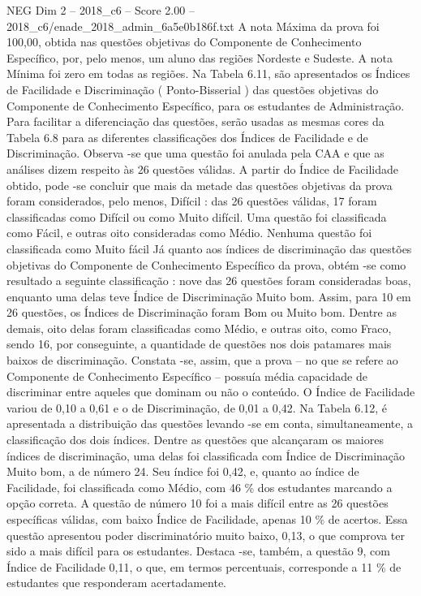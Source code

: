 \begin{textsample}{NEG Dim 2 – 2018\_c6 – Score 2.00 – 2018\_c6/enade\_2018\_admin\_6a5e0b186f.txt}
A nota Máxima da prova foi 100,00, obtida nas questões objetivas do Componente de Conhecimento Específico, por, pelo menos, um aluno das regiões Nordeste e Sudeste.
A nota Mínima foi zero em todas as regiões.
Na Tabela 6.11, são apresentados os Índices de Facilidade e Discriminação ( Ponto-Bisserial ) das questões objetivas do Componente de Conhecimento Específico, para os estudantes de Administração.
Para facilitar a diferenciação das questões, serão usadas as mesmas cores da Tabela 6.8 para as diferentes classificações dos Índices de Facilidade e de Discriminação.
Observa -se que uma questão foi anulada pela CAA e que as análises dizem respeito às 26 questões válidas.
A partir do Índice de Facilidade obtido, pode -se concluir que mais da metade das questões objetivas da prova foram considerados, pelo menos, Difícil : das 26 questões válidas, 17 foram classificadas como Difícil ou como Muito difícil.
Uma questão foi classificada como Fácil, e outras oito consideradas como Médio.
Nenhuma questão foi classificada como Muito fácil Já quanto aos índices de discriminação das questões objetivas do Componente de Conhecimento Específico da prova, obtém -se como resultado a seguinte classificação : nove das 26 questões foram consideradas boas, enquanto uma delas teve Índice de Discriminação Muito bom.
Assim, para 10 em 26 questões, os Índices de Discriminação foram Bom ou Muito bom.
Dentre as demais, oito delas foram classificadas como Médio, e outras oito, como Fraco, sendo 16, por conseguinte, a quantidade de questões nos dois patamares mais baixos de discriminação.
Constata -se, assim, que a prova – no que se refere ao Componente de Conhecimento Específico – possuía média capacidade de discriminar entre aqueles que dominam ou não o conteúdo.
O Índice de Facilidade variou de 0,10 a 0,61 e o de Discriminação, de 0,01 a 0,42.
Na Tabela 6.12, é apresentada a distribuição das questões levando -se em conta, simultaneamente, a classificação dos dois índices.
Dentre as questões que alcançaram os maiores índices de discriminação, uma delas foi classificada com Índice de Discriminação Muito bom, a de número 24.
Seu índice foi 0,42, e, quanto ao índice de Facilidade, foi classificada como Médio, com 46 \% dos estudantes marcando a opção correta.
A questão de número 10 foi a mais difícil entre as 26 questões específicas válidas, com baixo Índice de Facilidade, apenas 10 \% de acertos.
Essa questão apresentou poder discriminatório muito baixo, 0,13, o que comprova ter sido a mais difícil para os estudantes.
Destaca -se, também, a questão 9, com Índice de Facilidade 0,11, o que, em termos percentuais, corresponde a 11 \% de estudantes que responderam acertadamente.

\end{textsample}
